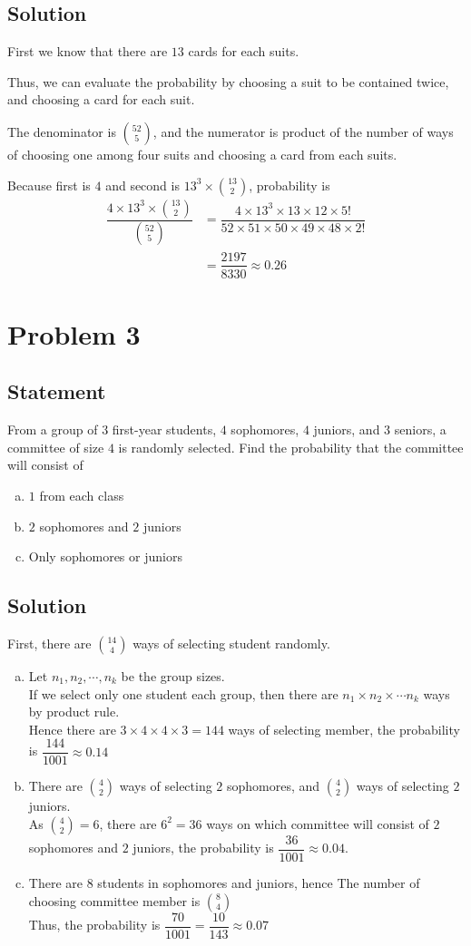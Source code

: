 \documentclass[12pt]{article}
\theoremstyle{plain}
\begin{document}
\subsection*{Solution}
First we know that there are $13$ cards for each suits.
\par Thus, we can evaluate the probability by choosing a suit to be contained twice, and choosing a card for each suit.
\par The denominator is $\binom{52}{5}$, and the numerator is product of the number of ways of choosing one among four suits and choosing a card from each suits.
\par Because first is $4$ and second is $13^3\times \binom{13}{2}$, probability is
$$\begin{aligned}
	\dfrac{4\times 13^3\times \binom{13}{2}}{\binom{52}{5}}&=\dfrac{4\times13^3\times13\times12\times5!}{52\times51\times50\times49\times48\times2!}
	\\&=\dfrac{2197}{8330}\approx0.26
\end{aligned}$$
\newpage
\section*{Problem 3}
\subsection*{Statement}
From a group of $3$ first-year students, $4$ sophomores, $4$ juniors, and $3$ seniors, a committee of size $4$ is randomly selected. Find the probability that the committee will consist of
\begin{enumerate}[(a)]
	\item $1$ from each class
	\item $2$ sophomores and $2$ juniors
	\item Only sophomores or juniors
\end{enumerate}
\subsection*{Solution}
First, there are $\binom{14}{4}$ ways of selecting student randomly.
\begin{enumerate}[(a)]
	\item Let $n_1,n_2,\cdots,n_k$ be the group sizes.
	\\ If we select only one student each group, then there are $n_1\times n_2\times \cdots n_k$ ways by product rule.
	\\ Hence there are $3\times 4\times 4\times 3=144$ ways of selecting member, the probability is $\dfrac{144}{1001}\approx0.14$
	\item There are $\binom{4}{2}$ ways of selecting $2$ sophomores, and $\binom{4}{2}$ ways of selecting $2$ juniors.
	\\ As $\binom{4}{2}=6$, there are $6^2=36$ ways on which committee will consist of $2$ sophomores and $2$ juniors, the probability is $\dfrac{36}{1001}\approx0.04$.
	\item There are $8$ students in sophomores and juniors, hence The number of choosing committee member is $\binom{8}{4}$
	\\ Thus, the probability is $\dfrac{70}{1001}=\dfrac{10}{143}\approx0.07$
\end{enumerate}
\newpage
\end{document}
